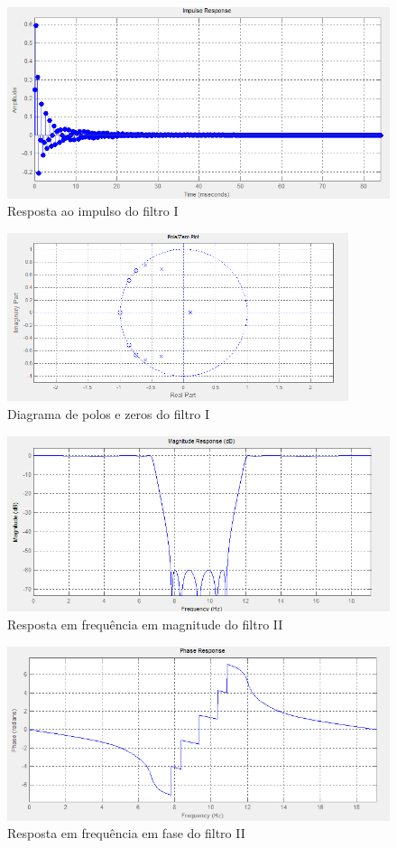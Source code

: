 \documentclass[a4paper,10pt]{article}
\begin{document}
\begin{figure}[ht]
 \centering
 \includegraphics[width=12cm]{pictures/Filtro1/RespImpulso.png}
 \caption{Resposta ao impulso do filtro I}
 \label{fig:resimp1}
\end{figure}

\begin{figure}[ht]
 \centering
 \includegraphics[width=10cm]{pictures/Filtro1/Polos&Zeros.png}
 \caption{Diagrama de polos e zeros do filtro I}
 \label{fig:diapolozero1}
\end{figure}

\begin{figure}[ht]
 \centering
 \includegraphics[width=12cm]{pictures/Filtro2/Magnitude.png}
 \caption{Resposta em frequência em magnitude do filtro II}
 \label{fig:magnitude2}
\end{figure}

\begin{figure}[ht]
 \centering
 \includegraphics[width=12cm]{pictures/Filtro2/Fase.png}
 \caption{Resposta em frequência em fase do filtro II}
 \label{fig:fase2}
\end{figure}
\end{document}

